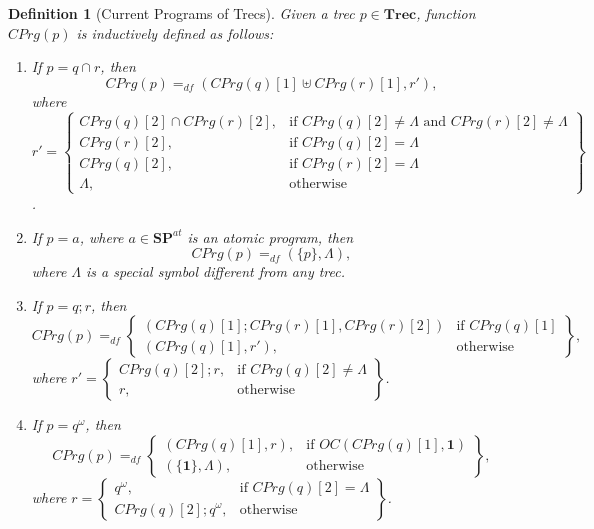 \documentclass{fcs}
\newtheorem{mydef}{Definition}[section]
\newcommand{\bff}[1]{\mathbf{#1}}
\newcommand{\noth}[0]{\mathbf{1}}
\newcommand{\SP}[0]{\mathbf{SP}}
\DeclareMathOperator{\seq}{;}
\DeclareMathOperator{\para}{\cap}
\newcommand{\CEvt}[0]{\mathit{CPrg}}
\newcommand{\none}[0]{\Lambda}
\newcommand{\Trec}[0]{\bff{Trec}}
\newcommand{\ASP}[0]{\SP^{\mathit{at}}}
\newcommand{\OC}[0]{\mathit{OC}}
\newcommand{\dddef}[0]{=_{df}}
\begin{document}
\ifx %
\begin{mydef}[Current Programs of Trecs]
	\label{def:Current Events of a Trec}
	Given a trec $p\in \Trec$, function $\CEvt(p)$ is inductively defined as follows:
	
	\begin{enumerate}
		\item If $p=q\para r$, then
		$$\CEvt(p) \dddef (\CEvt(q)[1]\uplus \CEvt(r)[1], r'), $$
		where $r' = \left\{
		\begin{array}{ll}
		\CEvt(q)[2]\para \CEvt(r)[2], &\mbox{if $\CEvt(q)[2] \neq \none$ and $\CEvt(r)[2] \neq \none$}\\
		\CEvt(r)[2],  &\mbox{if $\CEvt(q)[2] = \none$}\\
		\CEvt(q)[2],  &\mbox{if $\CEvt(r)[2] = \none$}\\
		\none, &\mbox{otherwise}
		\end{array}
		\right\}$.
		
		\item If $p = a$, where $a\in \ASP$ is an atomic program, then
		$$\CEvt(p)\dddef (\{ p \}, \none), $$
		where $\none$ is a special symbol different from any trec.
	
		\item If $p=q\seq r$, then
		$$\CEvt(p)\dddef\left\{
		\begin{array}{ll}
		(\CEvt(q)[1];\CEvt(r)[1], \CEvt(r)[2]) &\mbox{if $\CEvt(q)[1]$}\\
		(\CEvt(q)[1], r'),  &\mbox{otherwise}
		\end{array}
		\right\},
		$$
		where $r' = \left\{
		\begin{array}{ll}
		\CEvt(q)[2]\seq r, &\mbox{if $\CEvt(q)[2] \neq \none$}\\
		r,  &\mbox{otherwise}
		\end{array}
		\right\}$.
		
		\item If $p = q^\omega$, then
		$$\CEvt(p)\dddef \left\{
		\begin{array}{ll}
		(\CEvt(q)[1], r), &\mbox{if $\OC(\CEvt(q)[1], \noth)$}\\
		(\{\noth\}, \none), &\mbox{otherwise}
		\end{array}
		\right\},
		$$
		where $r = \left\{
		\begin{array}{ll}
		q^\omega, &\mbox{if $\CEvt(q)[2] = \none$}\\
		\CEvt(q)[2]\seq q^\omega,  &\mbox{otherwise}
		\end{array}
		\right\}$.
		

	\end{enumerate}
	
\end{mydef}
\fi
\end{document}
